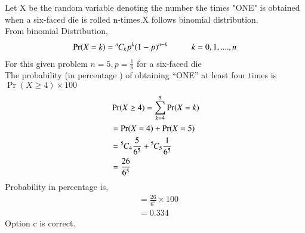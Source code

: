 
Let X be the random variable denoting the number the times "ONE" is obtained when a six-faced die is rolled n-times.X follows binomial distribution.\\
From binomial Distribution,
\begin{align*}
\Pr(X=k)={{{}^{n}\mkern-1muC_{k}}} p^k(1-p)^{n-k}\hspace{1cm} k=0,1,....,n
\end{align*}
For this given problem $ n=5,p=\frac{1}{6}$ for a six-faced die\\
The probability (in percentage ) of obtaining “ONE” at least four times is $\Pr(X\geq4)\times100$
\begin{align*}
&\Pr(X\geq4)=\sum_{k=4}^{5}\Pr(X=k)\\
&=\Pr(X=4)+\Pr(X=5)\\
&={{{}^{5}\mkern-1muC_{4}}}\frac{5}{6^5}+{{{}^{5}\mkern-1muC_{5}}}\frac{1}{6^5}\\
&=\frac{26}{6^5}
\end{align*}
Probability in percentage is,
\begin{align*}
    &=\frac{26}{6^5}\times100\\
    &=0.334
\end{align*}
Option c is correct.